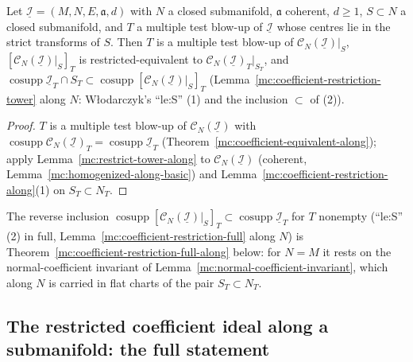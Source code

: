 \begin{lemma}
\label{mc:coefficient-restriction-tower-along}
\leanok
Let \(\underline{\mathcal I}=(M,N,E,\mathfrak a,d)\) with \(N\) a closed submanifold, \(\mathfrak a\) coherent, \(d\ge1\), \(S\subset N\) a closed submanifold, and \(T\) a multiple
test blow-up of \(\underline{\mathcal I}\) whose centres lie in the strict transforms of \(S\). Then \(T\) is a multiple test blow-up of \(\mathcal C_N(\underline{\mathcal I})|_S\),
\([\mathcal C_N(\underline{\mathcal I})|_S]_T\) is restricted-equivalent to \(\mathcal C_N(\underline{\mathcal I})_T|_{S_T}\), and
\(\operatorname{cosupp}\underline{\mathcal I}_T\cap S_T\subset\operatorname{cosupp}[\mathcal C_N(\underline{\mathcal I})|_S]_T\) (Lemma~\ref{mc:coefficient-restriction-tower} along \(N\):
Włodarczyk's ``le:S'' (1) and the inclusion \(\subset\) of (2)).
\end{lemma}
\begin{proof}
\leanok
\(T\) is a multiple test blow-up of \(\mathcal C_N(\underline{\mathcal I})\) with \(\operatorname{cosupp}\mathcal C_N(\underline{\mathcal I})_T=\operatorname{cosupp}\underline{\mathcal I}_T\)
(Theorem~\ref{mc:coefficient-equivalent-along}); apply Lemma~\ref{mc:restrict-tower-along} to \(\mathcal C_N(\underline{\mathcal I})\) (coherent,
Lemma~\ref{mc:homogenized-along-basic}) and Lemma~\ref{mc:coefficient-restriction-along}(1) on \(S_T\subset N_T\).
\end{proof}
The reverse inclusion \(\operatorname{cosupp}[\mathcal C_N(\underline{\mathcal I})|_S]_T\subset\operatorname{cosupp}\underline{\mathcal I}_T\) for \(T\) nonempty (``le:S'' (2) in full,
Lemma~\ref{mc:coefficient-restriction-full} along \(N\)) is Theorem~\ref{mc:coefficient-restriction-full-along} below: for \(N=M\) it rests on the normal-coefficient invariant of
Lemma~\ref{mc:normal-coefficient-invariant}, which along \(N\) is carried in flat charts of the pair \(S_T\subset N_T\).

\subsection{The restricted coefficient ideal along a submanifold: the full statement}

